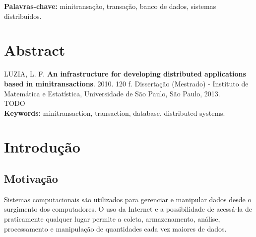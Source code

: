 \documentclass[11pt,twoside,a4paper]{book}
\begin{document}
\noindent \textbf{Palavras-chave:} minitransação, transação, banco de dados, sistemas distribuídos.

\chapter*{Abstract}
\noindent LUZIA, L. F. \textbf{An infrastructure for developing distributed applications based in minitransactions}. 
2010. 120 f.
Dissertação (Mestrado) - Instituto de Matemática e Estatística,
Universidade de São Paulo, São Paulo, 2013.
\\
TODO
\\

\noindent \textbf{Keywords:} minitransaction, transaction, database, distributed systems.

\tableofcontents


\listoffigures
\listoftables
\listofalgorithms
\lstlistoflistings
\mainmatter

\fancyhead[RE,LO]{\thesection}

\singlespacing              %

\chapter{Introdução}
\label{chap:introducao}

\section{Motivação}
\label{sec:motivacao}
Sistemas computacionais são utilizados para gerenciar e manipular dados desde o surgimento dos computadores.
O uso da Internet e a possibilidade de acessá-la de praticamente qualquer lugar permite a coleta, armazenamento, análise, processamento e manipulação de quantidades cada vez maiores de dados.
\end{document}

